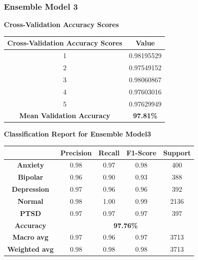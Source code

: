 \subsubsection{Ensemble Model 3}

\begin{center}
    \textbf{Cross-Validation Accuracy Scores} \\[0.5em]
    \begin{tabular}{|c|c|}
        \hline
        \textbf{Cross-Validation Accuracy Scores} & \textbf{Value} \\ \hline
        1 & 0.98195529 \\ \hline
        2 & 0.97549152 \\ \hline
        3 & 0.98060867 \\ \hline
        4 & 0.97603016 \\ \hline
        5 & 0.97629949 \\ \hline
        \textbf{Mean Validation Accuracy} & \textbf{97.81\%} \\ \hline
    \end{tabular}
\end{center}

\begin{center}
    \textbf{Classification Report for Ensemble Model3} \\[0.5em]
    \begin{tabular}{|c|c|c|c|c|}
        \hline
        & \textbf{Precision} & \textbf{Recall} & \textbf{F1-Score} & \textbf{Support} \\ \hline
        \textbf{Anxiety}    & 0.98 & 0.97 & 0.98 & 400  \\ \hline
        \textbf{Bipolar}    & 0.96 & 0.90 & 0.93 & 388  \\ \hline
        \textbf{Depression} & 0.97 & 0.96 & 0.96 & 392  \\ \hline
        \textbf{Normal}     & 0.98 & 1.00 & 0.99 & 2136 \\ \hline
        \textbf{PTSD}       & 0.97 & 0.97 & 0.97 & 397  \\ \hline
        \textbf{Accuracy}   & \multicolumn{4}{|c|}{\textbf{97.76\%}} \\ \hline
        \textbf{Macro avg}  & 0.97 & 0.96 & 0.97 & 3713 \\ \hline
        \textbf{Weighted avg} & 0.98 & 0.98 & 0.98 & 3713 \\ \hline
    \end{tabular}
\end{center}

